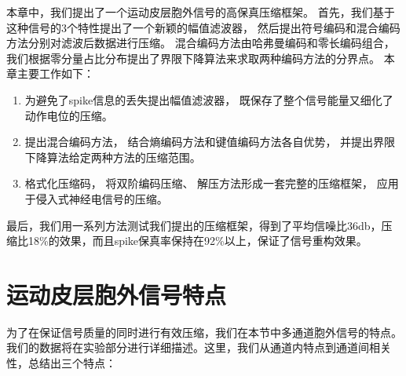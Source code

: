 本章中，我们提出了一个运动皮层胞外信号的高保真压缩框架。 首先，我们基于这种信号的3个特性提出了一个新颖的幅值滤波器，
然后提出符号编码和混合编码方法分别对滤波后数据进行压缩。 混合编码方法由哈弗曼编码和零长编码组合， 我们根据零分量占比分布提出了界限下降算法来求取两种编码方法的分界点。 
本章主要工作如下：

\begin{enumerate}
\item 为避免了spike信息的丢失提出幅值滤波器， 既保存了整个信号能量又细化了动作电位的压缩。
\item 提出混合编码方法， 结合熵编码方法和键值编码方法各自优势， 并提出界限下降算法给定两种方法的压缩范围。
\item 格式化压缩码， 将双阶编码压缩、 解压方法形成一套完整的压缩框架， 应用于侵入式神经电信号的压缩。
\end{enumerate}


最后，我们用一系列方法测试我们提出的压缩框架，得到了平均信噪比36db，压缩比18\%的效果，而且spike保真率保持在92\%以上，保证了信号重构效果。





\section{运动皮层胞外信号特点}\label{sec:characteristic}


为了在保证信号质量的同时进行有效压缩，我们在本节中多通道胞外信号的特点。我们的数据将在实验部分进行详细描述。这里，我们从通道内特点到通道间相关性，总结出三个特点：

